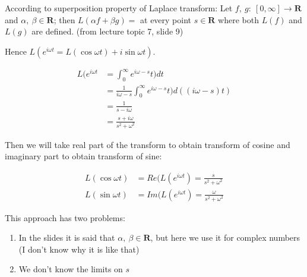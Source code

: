 According to superposition property of Laplace transform: Let $f,\ g:\ [0, \infty] \to \mathbf{R}$
and $\alpha,\ \beta \in \mathbf{R}$; then $L(\alpha f + \beta g) = $ at every point $s \in \mathbf{R}$ where both $L(f)$ and $L(g)$ are defined. (from lecture topic 7, slide 9)

Hence $L(e^{i \omega t} = L(\cos{\omega t}) + i \sin{\omega t})$.

\begin{displaymath}
    \begin{aligned}
        L(e^{i \omega t} & = \int_0^{\infty} e^{i \omega - s}t) dt \\
        & = \frac{1}{i \omega - s} \int_0^{\infty} e^{i \omega - s}t) d((i \omega - s)t) \\
        & = \frac{1}{s - i \omega} \\
        & = \frac{s + i \omega}{s^2 + \omega^2}
    \end{aligned}
\end{displaymath}

Then we will take real part of the transform to obtain transform of cosine and imaginary part to obtain transform of sine:

\begin{displaymath}
    \begin{aligned}
        L(\cos{\omega t}) & = Re(L(e^{i \omega t}) = \frac{s}{s^2 + \omega^2} \\
        L(\sin{\omega t}) & = Im(L(e^{i \omega t}) = \frac{\omega}{s^2 + \omega^2}
    \end{aligned}
\end{displaymath}

This approach has two problems: 
\begin{enumerate}
    \item In the slides it is said that $\alpha,\ \beta \in \mathbf{R}$, but here we use it for complex numbers (I don't know why it is like that)
    \item We don't know the limits on $s$
\end{enumerate}
